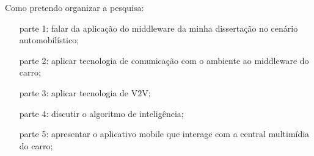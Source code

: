 Como pretendo organizar a pesquisa:

\begin{itemize}
    \item[parte 1:] falar da aplicação do middleware da minha dissertação no cenário automobilístico;
    \item[parte 2:] aplicar tecnologia de comunicação com o ambiente ao middleware do carro;
    \item[parte 3:] aplicar tecnologia de V2V;
    \item[parte 4:] discutir o algoritmo de inteligência;
    \item[parte 5:] apresentar o aplicativo mobile que interage com a central multimídia do carro;
\end{itemize}

